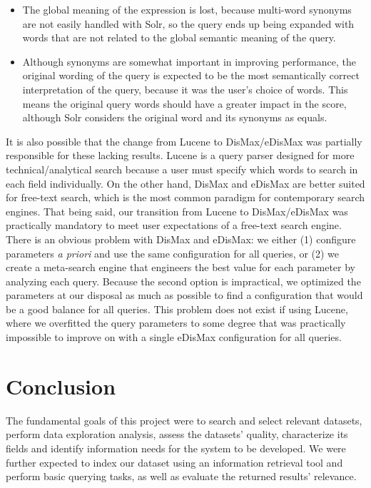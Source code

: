 \documentclass[sigconf, authorversion]{acmart}
\begin{document}
\begin{itemize}
    \item The global meaning of the expression is lost, because multi-word synonyms are not easily handled with Solr, so the query ends up being expanded with words that are not related to the global semantic meaning of the query.
    \item Although synonyms are somewhat important in improving performance, the original wording of the query is expected to be the most semantically correct interpretation of the query, because it was the user's choice of words. This means the original query words should have a greater impact in the score, although Solr considers the original word and its synonyms as equals.
\end{itemize}

It is also possible that the change from Lucene to DisMax/eDisMax was partially responsible for these lacking results. Lucene is a query parser designed for more technical/analytical search because a user must specify which words to search in each field individually. On the other hand, DisMax and eDisMax are better suited for free-text search, which is the most common paradigm for contemporary search engines. That being said, our transition from Lucene to DisMax/eDisMax was practically mandatory to meet user expectations of a free-text search engine. There is an obvious problem with DisMax and eDisMax: we either (1) configure parameters \textit{a priori} and use the same configuration for all queries, or (2) we create a meta-search engine that engineers the best value for each parameter by analyzing each query. Because the second option is impractical, we optimized the parameters at our disposal as much as possible to find a configuration that would be a good balance for all queries. This problem does not exist if using Lucene, where we overfitted the query parameters to some degree that was practically impossible to improve on with a single eDisMax configuration for all queries.

\section{Conclusion}

The fundamental goals of this project were to search and select relevant datasets, perform data exploration analysis, assess the datasets' quality, characterize its fields and identify information needs for the system to be developed. We were further expected to index our dataset using an information retrieval tool and perform basic querying tasks, as well as evaluate the returned results' relevance.
\end{document}
